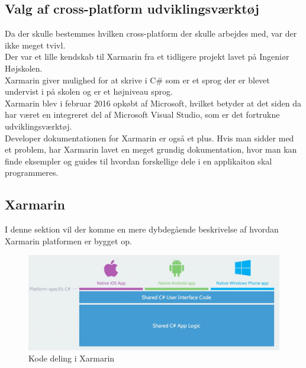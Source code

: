 \subsection{Valg af cross-platform udviklingsværktøj}
Da der skulle bestemmes hvilken cross-platform der skulle arbejdes med, var der ikke meget tvivl. \\
Der var et lille kendskab til Xarmarin fra et tidligere projekt lavet på Ingeniør Højskolen. \\
Xarmarin giver mulighed for at skrive i C\# som er et sprog der er blevet undervist i på skolen og er et højniveau sprog. \\
Xarmarin blev i februar 2016 opkøbt af Microsoft, hvilket betyder at det siden da har været en integreret del af Microsoft Visual Studio, som er det fortrukne udviklingsværktøj.\\
Developer dokumentationen for Xarmarin er også et plus. Hvis man sidder med et problem, har Xarmarin lavet en meget grundig dokumentation, hvor man kan finde eksempler og guides til hvordan forskellige dele i en applikaiton skal programmeres.

\subsection{Xarmarin}
I denne sektion vil der komme en mere dybdegående beskrivelse af hvordan Xarmarin platformen er bygget op.



\begin{figure}[H]
	\centering
	\includegraphics[width=1\linewidth]{Applikation/XarmarinShare.JPG}
	\caption{Kode deling i Xarmarin}
	\label{fig:CodeShare}
\end{figure}


\clearpage